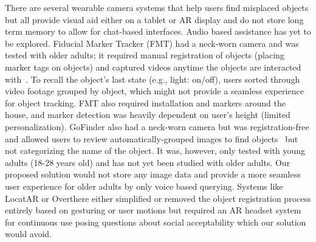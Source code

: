 There are several wearable camera systems that help users find misplaced objects but all provide visual aid either on a tablet or AR display and do not store long term memory to allow for chat-based interfaces. Audio based assistance has yet to be explored. Fiducial Marker Tracker (FMT) had a neck-worn camera and was tested with older adults; it required manual registration of objects (placing marker tags on objects) and captured videos anytime the objects are interacted with~\cite{fmt}. To recall the object's last state (e.g., light: on/off), users sorted through video footage grouped by object, which might not provide a seamless experience for object tracking. FMT also required installation and markers around the house, and marker detection was heavily dependent on user’s height (limited personalization). GoFinder also had a neck-worn camera but was registration-free and allowed users to review automatically-grouped images to find objects~\cite{gofinder} but not categorizing the name of the object. It was, however, only tested with young adults (18-28 years old) and has not yet been studied with older adults. Our proposed solution would not store any image data and provide a more seamless user experience for older adults by only voice based querying.  %
Systems like LocatAR \cite{oshimi2023locatar} or Overthere \cite{seo2021overthere} either simplified or removed the object registration process entirely based on gesturing or user motions but required an AR headset system for continuous use posing questions about social acceptability which our solution would avoid. %

